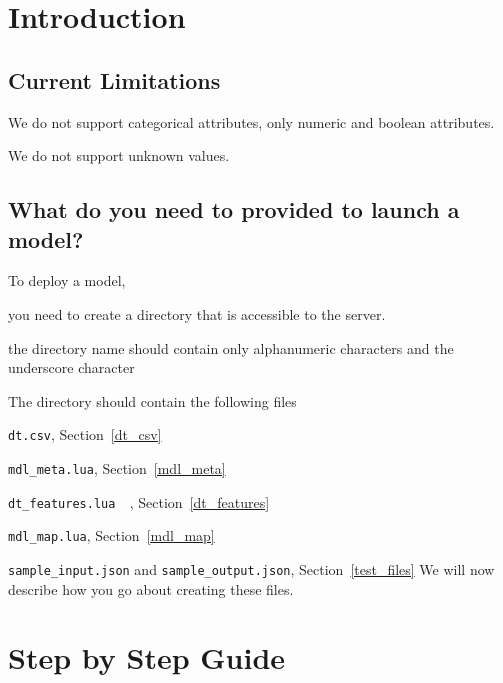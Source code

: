 
\section{Introduction}
\TBC

\subsection{Current Limitations}

\be
\item 
We do not support categorical attributes, 
only numeric and boolean attributes. 
\item We do not support unknown values. 
\ee

\subsection{What do you need to provided to launch a model?}

To deploy a model, 
\be
\item you need to create a directory that is accessible to the server. 
\item the directory name should contain only alphanumeric characters 
and the underscore character
\item The directory should contain the following files
\be
\item \verb+dt.csv+, Section~\ref{dt_csv}
\item \verb+mdl_meta.lua+, Section~\ref{mdl_meta}
\item \verb+dt_features.lua  +, Section~\ref{dt_features}
\item \verb+mdl_map.lua+, Section~\ref{mdl_map}
\item \verb+sample_input.json+ and \verb+sample_output.json+, Section~\ref{test_files}
\ee
\ee
We will now describe how you go about creating these files.

\section{Step by Step Guide}

